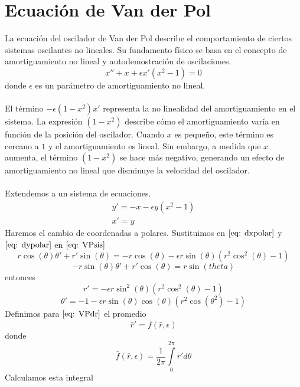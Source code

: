 	
\section{Ecuación de Van der Pol}
La ecuación del oscilador de Van der Pol describe el comportamiento de ciertos sistemas oscilantes no lineales.
Su fundamento físico se basa en el concepto de amortiguamiento no lineal y autodemostración de oscilaciones.
\begin{equation}\label{eq: VP}
	x''+x+\epsilon x'(x^2-1)=0
\end{equation}
donde $\epsilon$ es un parámetro de amortiguamiento no lineal.\\
\\El término $-\epsilon(1 - x^2)x'$ representa la no linealidad del amortiguamiento en el sistema. La expresión
$(1 - x^2)$ describe cómo el amortiguamiento varía en función de la posición del oscilador. Cuando $x$ es
pequeño, este término es cercano a $1$ y el amortiguamiento es lineal. Sin embargo, a medida que $x$
aumenta, el término $(1 - x^2)$ se hace más negativo, generando un efecto de amortiguamiento no lineal que
disminuye la velocidad del oscilador.\\
\\Extendemos a un sistema de ecuaciones.
\begin{equation}\label{eq: VPsis}
	\begin{matrix}
		y'=-x-\epsilon y(x^2-1) \\
		x'=y
	\end{matrix}
\end{equation}
Haremos el cambio de coordenadas a polares.
Sustituimos en $\eqref{eq: dxpolar}$ y $\eqref{eq: dypolar}$ en $\eqref{eq: VPsis}$
$$r\cos(\theta)\theta'+r'\sin(\theta)=-r\cos(\theta)-\epsilon r\sin(\theta)(r^2\cos^2(\theta)-1)$$
$$-r\sin(\theta)\theta'+r'\cos(\theta)=r\sin(theta)$$
entonces
\begin{equation}\label{eq: VPdr}
	r'=-\epsilon r\sin^2(\theta)(r^2\cos^2(\theta)-1)
\end{equation}
\begin{equation}\label{eq: VPdtheta}
	\theta'=-1-\epsilon r\sin(\theta)\cos(\theta)(r^2\cos(\theta^2)-1)
\end{equation}
Definimos para $\eqref{eq: VPdr}$ el promedio
\begin{equation}\label{eq: drbar}
	\bar{r}'=\bar{f}(\bar{r},\epsilon)
\end{equation}
donde
$$\bar{f}(\bar{r},\epsilon)=\frac{1}{2\pi}\int\limits_0^{2\pi}r'd\theta$$
Calculamos esta integral
